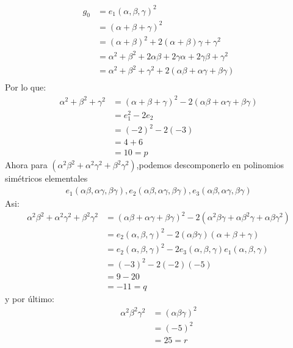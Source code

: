 \begin{solucion}
  \begin{align*}
    g_0 &= e_1(\alpha,\beta,\gamma)^2\\
    &= (\alpha + \beta + \gamma)^2\\
    &= (\alpha + \beta)^2 + 2(\alpha + \beta)\gamma + \gamma^2\\
    &= \alpha^2 + \beta^2 + 2\alpha\beta + 2\gamma\alpha + 2\gamma\beta + \gamma^2\\
    &= \alpha^2 + \beta^2 + \gamma^2 + 2(\alpha\beta + \alpha\gamma + \beta\gamma)\\
  \end{align*}
  Por lo que:
  \begin{align*}
    \alpha^2 + \beta^2 + \gamma^2 &= (\alpha + \beta + \gamma)^2 - 2(\alpha\beta + \alpha\gamma + \beta\gamma)\\
    &= e_1^2 - 2e_2\\
    &= (-2)^2 - 2(-3)\\
    &= 4 + 6\\
    &= 10 =p
  \end{align*}
  Ahora para $(\alpha^2\beta^2 + \alpha^2\gamma^2 + \beta^2\gamma^2)$,podemos descomponerlo en polinomios simétricos 
  elementales 
  \begin{align*}
    e_1(\alpha\beta, \alpha\gamma,\beta\gamma), e_2(\alpha\beta, \alpha\gamma,\beta\gamma),e_3(\alpha\beta, \alpha\gamma,\beta\gamma)
  \end{align*}
  Asi:
  \begin{align*}
    \alpha^2\beta^2 + \alpha^2\gamma^2 + \beta^2\gamma^2 &= (\alpha\beta + \alpha\gamma + \beta\gamma)^2 - 2(\alpha^2\beta\gamma + \alpha\beta^2\gamma + \alpha\beta\gamma^2)\\
    &= e_2(\alpha,\beta,\gamma)^2 - 2(\alpha\beta\gamma)(\alpha + \beta + \gamma)\\
    &= e_2(\alpha,\beta,\gamma)^2  - 2e_3(\alpha,\beta,\gamma)e_1(\alpha,\beta,\gamma)\\
    &= (-3)^2 - 2(-2)(-5)\\
    &= 9 -20\\
    &= -11=q
  \end{align*}
  y por último:
  \begin{align*}
    \alpha^2\beta^2\gamma^2 &= (\alpha\beta\gamma)^2\\
    &= (-5)^2\\
    &= 25 = r
  \end{align*}

\end{solucion}
